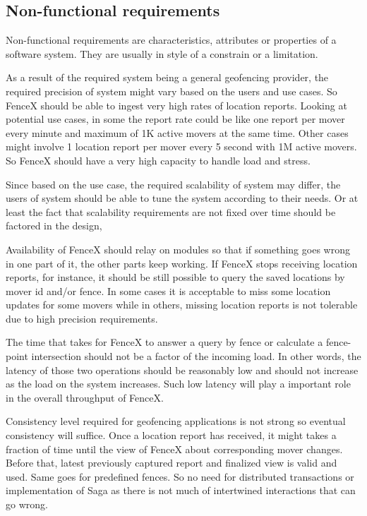 \documentclass[a4]{report}
\begin{document}
    \subsection{Non-functional requirements}
    Non-functional requirements are characteristics, attributes or properties of a software system.
    They are usually in style of a constrain or a limitation.

    As a result of the required system being a general geofencing provider, the required precision of system might vary
    based on the users and use cases.
    So FenceX should be able to ingest very high rates of location reports.
    Looking at potential use cases, in some the report rate could be like one report per mover every minute and
    maximum of 1K active movers at the same time.
    Other cases might involve 1 location report per mover every 5 second with 1M active movers.
    So FenceX should have a very high capacity to handle load and stress.

    Since based on the use case, the required scalability of system may differ, the users of system should be able to
    tune the system according to their needs.
    Or at least the fact that scalability requirements are not fixed over time should be factored in the design,

    Availability of FenceX should relay on modules so that if something goes wrong in one part of it, the other parts
    keep working.
    If FenceX stops receiving location reports, for instance, it should be still possible to query the saved
    locations by mover id and/or fence.
    In some cases it is acceptable to miss some location updates for some movers while in others, missing location
    reports is not tolerable due to high precision requirements.

    The time that takes for FenceX to answer a query by fence or calculate a fence-point intersection should not be a
    factor of the incoming load.
    In other words, the latency of those two operations should be reasonably low and should not increase as the load
    on the system increases.
    Such low latency will play a important role in the overall throughput of FenceX.

    Consistency level required for geofencing applications is not strong so eventual consistency will suffice.
    Once a location report has received, it might takes a fraction of time until the view of FenceX about
    corresponding mover changes.
    Before that, latest previously captured report and finalized view is valid and used.
    Same goes for predefined fences.
    So no need for distributed transactions or implementation of Saga as there is not much of intertwined
    interactions that can go wrong.
\end{document}
